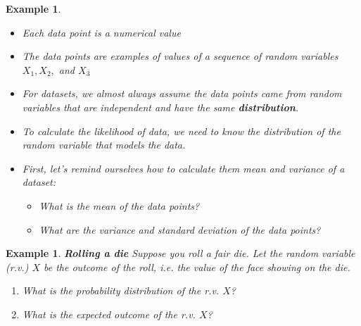 \documentclass[12pt]{amsart}
\newtheorem{example}[theorem]{Example}
\begin{document}
{\begin{example}
\begin{itemize}
\item Each data point is a numerical value
\item The data points are examples of values of a sequence of random variables $X_1, X_2,$ and $X_3$
\item For datasets, we almost always assume the data points came from random variables that are independent and have the same \textbf{distribution}. 
\item To calculate the likelihood of data, we need to know the distribution of the random variable that models the data.

\item First, let's remind ourselves how to calculate them mean and variance of a dataset:
	\begin{itemize}
	\item What is the mean of the data points?

\vspace{2.5cm}
	\item What are the variance and standard deviation of the data points?


	\end{itemize}


\end{itemize}
\end{example} 

\newpage



\begin{example}  \textbf{Rolling a die} \newline
Suppose you roll a fair die. Let the random variable (r.v.) $X$ be the outcome of the roll, i.e. the value of the face showing on the die. 

\begin{enumerate}
\item What is the probability distribution of the r.v. $X$?
\vspace{3cm}

\item  What is the expected outcome of the r.v. $X$?



\vspace{5cm}


\end{enumerate}
\end{example}}
\end{document}
